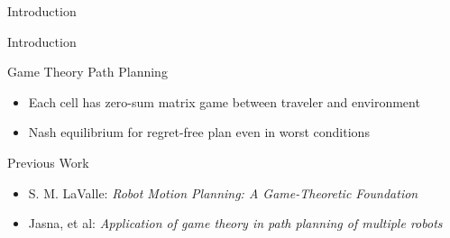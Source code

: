 \documentclass[xcolor=table, 9pt]{beamer}
\begin{document}
\begin{section}{Introduction}
\begin{frame}{Introduction}
\begin{block}{Game Theory Path Planning}
\begin{itemize}
                \item Each cell has zero-sum matrix game between traveler and environment
                \item Nash equilibrium for regret-free plan even in worst conditions
            \end{itemize}
        \end{block}
        \begin{block}{Previous Work}
            \begin{itemize}
                \item S. M. LaValle: \textit{Robot Motion Planning: A Game-Theoretic Foundation}
                \item Jasna, et al: \textit{Application of game theory in path planning of multiple robots}
            \end{itemize}    
        \end{block}
    \end{frame}
\end{section}
\end{document}
